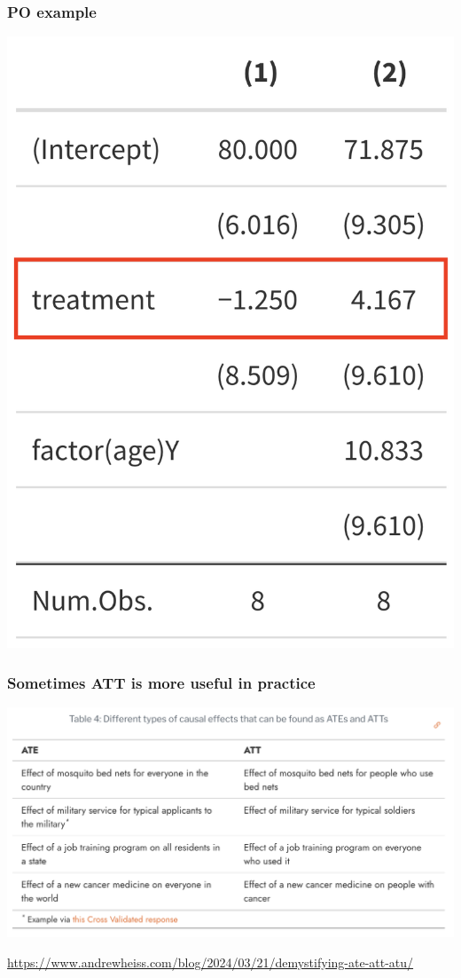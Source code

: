 \documentclass[aspectratio=43]{beamer}
\begin{document}
\begin{frame}
\frametitle{PO example}
\centering

\includegraphics[width = .5\textwidth]{../img/po_regression}

\end{frame}
  
\begin{frame}
\frametitle{Sometimes ATT is more useful in practice}
\centering

\includegraphics[width = \textwidth]{../img/ate_att}

\href{https://www.andrewheiss.com/blog/2024/03/21/demystifying-ate-att-atu/}{\footnotesize https://www.andrewheiss.com/blog/2024/03/21/demystifying-ate-att-atu/}
  

\end{frame}
\end{document}
